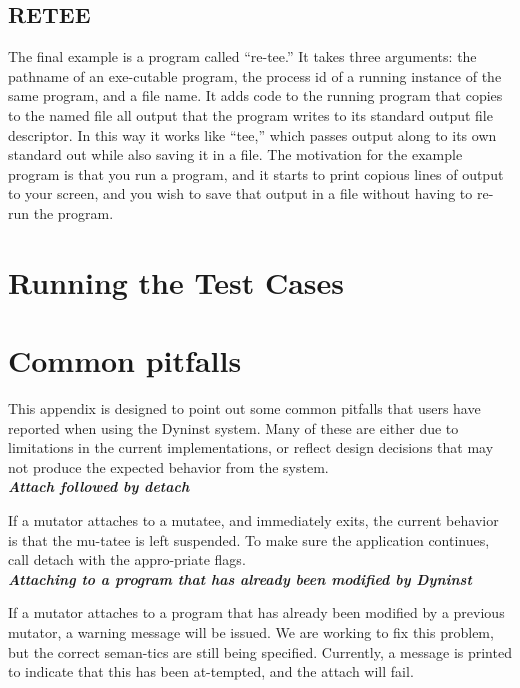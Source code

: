 \documentclass[twopages,a4paper]{article}
\begin{document}


\subsection{RETEE}

The final example is a program called “re-tee.”  It takes three arguments: the pathname of an exe-cutable program, the process id of a running instance of the same program, and a file name.  It adds code to the running program that copies to the named file all output that the program writes to its standard output file descriptor.  In this way it works like “tee,” which passes output along to its own standard out while also saving it in a file.  The motivation for the example program is that you run a program, and it starts to print copious lines of output to your screen, and you wish to save that output in a file without having to re-run the program. 




\pagebreak
\section{Running the Test Cases}

\pagebreak
\section{Common pitfalls}

This appendix is designed to point out some common pitfalls that users have reported when using the Dyninst system.  Many of these are either due to limitations in the current implementations, or reflect design decisions that may not produce the expected behavior from the system.\\

\emph{\textbf {Attach followed by detach}}

If a mutator attaches to a mutatee, and immediately exits, the current behavior is that the mu-tatee is left suspended.  To make sure the application continues, call detach with the appro-priate flags.\\

\emph{\textbf{Attaching to a program that has already been modified by Dyninst}}

If a mutator attaches to a program that has already been modified by a previous mutator, a warning message will be issued. We are working to fix this problem, but the correct seman-tics are still being specified. Currently, a message is printed to indicate that this has been at-tempted, and the attach will fail.\\
\end{document}
